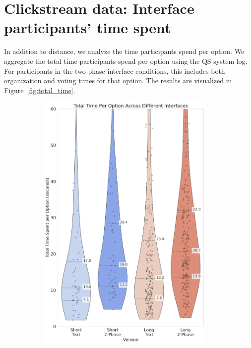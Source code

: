 \section{Clickstream data: Interface participants' time spent}
In addition to distance, we analyze the time participants spend per option. We aggregate the total time participants spend per option using the QS system log. For participants in the two-phase interface conditions, this includes both organization and voting times for that option. The results are visualized in Figure~\ref{fig:total_time}.


\begin{figure}[h]
    \centering
    \begin{subfigure}[b]{0.52\textwidth}
        \centering
        \includegraphics[width=0.95\textwidth, trim=0 10 0 10, clip]{content/image/results/total_time_per_option.pdf}

\end{subfigure}
\end{figure}
